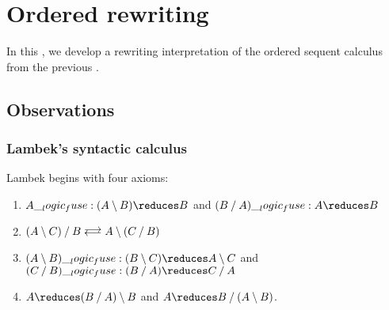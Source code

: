 \chapter{Ordered rewriting}\label{ch:ordered-rewriting}

In this , we develop a rewriting interpretation of the ordered sequent calculus from the previous .


\section{Observations}

\subsection{Lambek's syntactic calculus}

\NewDocumentCommand \longrightleftarrows { } { \mathrel{\substack{\textstyle\longrightarrow\\[-.6ex]\textstyle\longleftarrow}} }

Lambek begins with four axioms:
\begin{enumerate}[label=(\Roman*)]
\item $A \fuse (A \limp B) \reduces B$ and $(B \pmir A) \fuse A \reduces B$
\item $(A \limp C) \pmir B \longrightleftarrows A \limp (C \pmir B)$
\item $(A \limp B) \fuse (B \limp C) \reduces A \limp C$ and $(C \pmir B) \fuse (B \pmir A) \reduces C \pmir A$
\item $A \reduces (B \pmir A) \limp B$ and $A \reduces B \pmir (A \limp B)$.
\end{enumerate}

